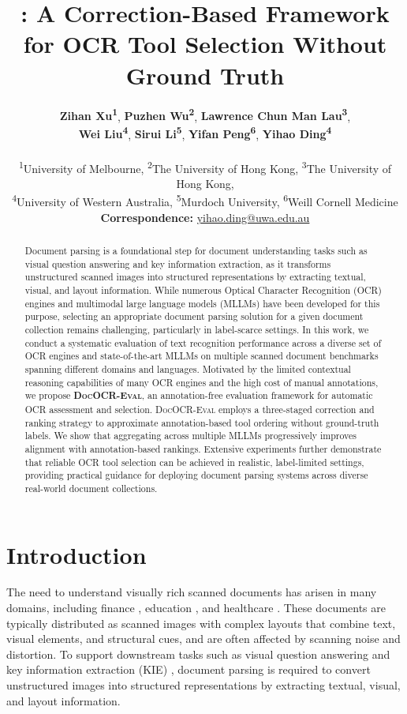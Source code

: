 \documentclass[11pt]{article}
\title{\projectname: A Correction-Based Framework for OCR Tool Selection Without Ground Truth}
\author{
  \textbf{Zihan Xu\textsuperscript{1}},
  \textbf{Puzhen Wu\textsuperscript{2}},
  \textbf{Lawrence Chun Man Lau\textsuperscript{3}}, \\
  \textbf{Wei Liu\textsuperscript{4}}, 
  \textbf{Sirui Li\textsuperscript{5}},
  \textbf{Yifan Peng\textsuperscript{6}},
  \textbf{Yihao Ding\textsuperscript{4}}
\\
\\
  \textsuperscript{1}University of Melbourne,
  \textsuperscript{2}The University of Hong Kong, 
  \textsuperscript{3}The University of Hong Kong, \\
  \textsuperscript{4}University of Western Australia,
  \textsuperscript{5}Murdoch University,
  \textsuperscript{6}Weill Cornell Medicine
\\
  \small{
    \textbf{Correspondence:} \href{mailto:email@domain}{yihao.ding@uwa.edu.au}
  }
}
\newcommand{\projectname}{\textsc{DocOCR-Eval}\xspace}
\begin{document}
\maketitle
\begin{abstract}
Document parsing is a foundational step for document understanding tasks such as visual question answering and key information extraction, as it transforms unstructured scanned images into structured representations by extracting textual, visual, and layout information. While numerous Optical Character Recognition (OCR) engines and multimodal large language models (MLLMs) have been developed for this purpose, selecting an appropriate document parsing solution for a given document collection remains challenging, particularly in label-scarce settings. In this work, we conduct a systematic evaluation of text recognition performance across a diverse set of OCR engines and state-of-the-art MLLMs on multiple scanned document benchmarks spanning different domains and languages. Motivated by the limited contextual reasoning capabilities of many OCR engines and the high cost of manual annotations, we propose \textbf{\projectname}, an annotation-free evaluation framework for automatic OCR assessment and selection. \projectname employs a three-staged correction and ranking strategy to approximate annotation-based tool ordering without ground-truth labels. We show that aggregating across multiple MLLMs progressively improves alignment with annotation-based rankings. Extensive experiments further demonstrate that reliable OCR tool selection can be achieved in realistic, label-limited settings, providing practical guidance for deploying document parsing systems across diverse real-world document collections.
\end{abstract}

\section{Introduction}

The need to understand visually rich scanned documents has arisen in many domains, including finance \cite{formnlu}, education \cite{vies}, and healthcare \cite{rxpad}. These documents are typically distributed as scanned images with complex layouts that combine text, visual elements, and structural cues, and are often affected by scanning noise and distortion. To support downstream tasks such as visual question answering \cite{docvqa,mmvqa} and key information extraction (KIE) \cite{sroie,ding2025synjac}, document parsing is required to convert unstructured images into structured representations by extracting textual, visual, and layout information.
\end{document}
